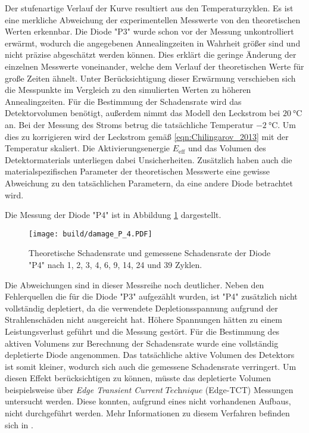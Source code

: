 Der stufenartige Verlauf der Kurve resultiert aus den Temperaturzyklen.
Es ist eine merkliche Abweichung der experimentellen Messwerte von den theoretischen
Werten erkennbar. Die Diode "P3" wurde schon vor der Messung unkontrolliert erwärmt, wodurch
die angegebenen Annealingzeiten in Wahrheit größer sind und nicht präzise abgeschätzt werden können. Dies erklärt die
geringe Änderung der einzelnen Messwerte voneinander, welche dem
Verlauf der theoretischen Werte für große Zeiten ähnelt.
Unter Berücksichtigung dieser Erwärmung verschieben sich die Messpunkte im Vergleich zu den
simulierten Werten zu höheren Annealingzeiten.
Für die Bestimmung der Schadensrate
wird das Detektorvolumen benötigt, außerdem nimmt das Modell den Leckstrom bei $\SI{20}{\celsius}$ an.
Bei der Messung des Stroms betrug die tatsächliche Temperatur
$\SI{-2}{\celsius}$. Um dies zu korrigieren wird der Leckstrom gemäß \ref{eqn:Chilingarov_2013}
mit der Temperatur skaliert. Die Aktivierungsenergie $E_{\mathrm{eff}}$ und das Volumen des Detektormaterials
unterliegen dabei Unsicherheiten. Zusätzlich haben auch die materialspezifischen Parameter
der theoretischen Messwerte eine gewisse Abweichung zu den tatsächlichen Parametern, da
eine andere Diode betrachtet wird.

Die Messung der Diode "P4" ist in Abbildung \ref{fig:P_4}
dargestellt.

\begin{figure}
  \centering
    \texttt{[image: build/damage\_P\_4.PDF]}
\caption{Theoretische Schadensrate und gemessene Schadensrate
der Diode "P4" nach 1, 2, 3, 4, 6, 9, 14, 24 und 39 Zyklen.}
\label{fig:P_4}
\end{figure}

Die Abweichungen sind in dieser Messreihe noch deutlicher. Neben den Fehlerquellen die
für die Diode "P3" aufgezählt wurden, ist "P4" zusätzlich nicht vollständig depletiert, da die verwendete
Depletionsspannung aufgrund der Strahlenschäden nicht ausgereicht hat. Höhere Spannungen hätten zu
einem Leistungsverlust geführt und die Messung gestört.
Für die Bestimmung des aktiven Volumens zur Berechnung der Schadensrate wurde eine vollständig
depletierte Diode angenommen. Das tatsächliche aktive Volumen des Detektors ist somit kleiner, wodurch sich auch
die gemessene Schadensrate verringert.
Um diesen Effekt berücksichtigen zu können, müsste das depletierte Volumen
beispielsweise über \textit{Edge Transient Current} ${\textit{Technique}}$ (Edge-TCT) Messungen untersucht werden.
Diese konnten, aufgrund eines nicht vorhandenen Aufbaus, nicht durchgeführt werden.
Mehr Informationen zu diesem Verfahren befinden sich in \cite{edge}.
